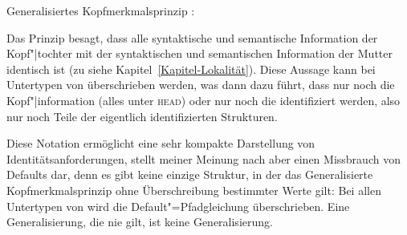 \eas
Generalisiertes Kopfmerkmalsprinzip \citep[]{GSag2000a-u}:\\
 \impl
{}
\zs


\noindent
Das Prinzip besagt, dass alle syntaktische und semantische Information der Kopf"|tochter
mit der syntaktischen und semantischen Information der Mutter identisch ist (zu \synsem
siehe Kapitel~\ref{Kapitel-Lokalität}). Diese Aussage kann bei Untertypen von  überschrieben werden,
was dann dazu führt, dass \zb nur noch die Kopf"|information (alles unter \textsc{head}) oder nur
noch die \compswe identifiziert werden, also nur noch Teile der eigentlich identifizierten
Strukturen.

Diese Notation ermöglicht eine sehr kompakte Darstellung von Identitätsanforderungen, stellt
meiner Meinung nach aber einen Missbrauch von Defaults dar, denn es gibt keine einzige Struktur,
in der das Generalisierte Kopfmerkmalsprinzip ohne Überschreibung bestimmter Werte gilt: Bei allen Untertypen von 
wird die Default"=Pfadgleichung überschrieben. Eine Generalisierung, die nie gilt, ist keine Generalisierung.



